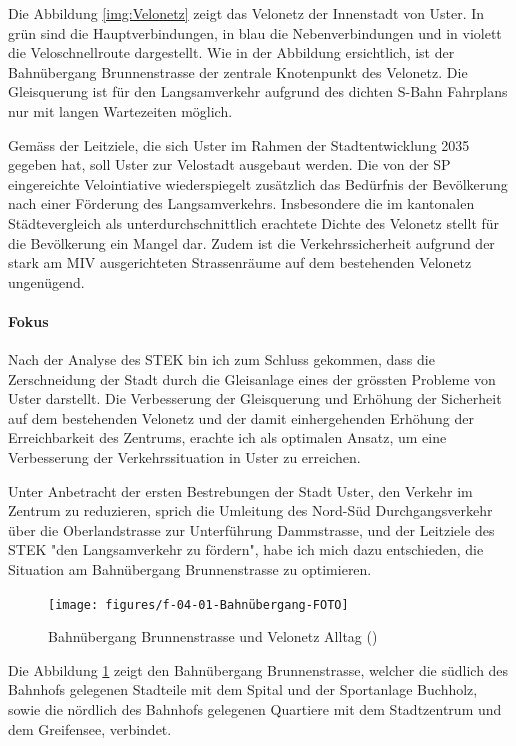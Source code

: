 Die Abbildung \ref{img:Velonetz} zeigt das Velonetz der Innenstadt von Uster. In grün sind die Hauptverbindungen, in blau die Nebenverbindungen und in violett die Veloschnellroute dargestellt. Wie in der Abbildung ersichtlich, ist der Bahnübergang Brunnenstrasse der zentrale Knotenpunkt des Velonetz. Die Gleisquerung ist für den Langsamverkehr aufgrund des dichten S-Bahn Fahrplans nur mit langen Wartezeiten möglich. 

Gemäss der Leitziele, die sich Uster im Rahmen der Stadtentwicklung 2035 gegeben hat, soll Uster zur Velostadt ausgebaut werden. Die von der SP eingereichte Velointiative wiederspiegelt zusätzlich das Bedürfnis der Bevölkerung nach einer Förderung des Langsamverkehrs. Insbesondere die im kantonalen Städtevergleich als unterdurchschnittlich erachtete Dichte des Velonetz stellt für die Bevölkerung ein Mangel dar. Zudem ist die Verkehrssicherheit aufgrund der stark am MIV ausgerichteten Strassenräume auf dem bestehenden Velonetz ungenügend. \\

\paragraph{Fokus} 

Nach der Analyse des STEK bin ich zum Schluss gekommen, dass die Zerschneidung der Stadt durch die Gleisanlage eines der grössten Probleme von Uster darstellt. Die Verbesserung der Gleisquerung und Erhöhung der Sicherheit auf dem bestehenden Velonetz und der damit einhergehenden Erhöhung der Erreichbarkeit des Zentrums, erachte ich als optimalen Ansatz, um eine Verbesserung der Verkehrssituation in Uster zu erreichen. 

Unter Anbetracht der ersten Bestrebungen der Stadt Uster, den Verkehr im Zentrum zu reduzieren, sprich die Umleitung des Nord-Süd Durchgangsverkehr über die Oberlandstrasse zur Unterführung Dammstrasse, und der Leitziele des STEK "den Langsamverkehr zu fördern", habe ich mich dazu entschieden, die Situation am Bahnübergang Brunnenstrasse zu optimieren.


\begin{figure}[h!]
	\centering
	\texttt{[image: figures/f-04-01-Bahnübergang-FOTO]}
	\caption[Bahnübergang Brunnenstrasse]{Bahnübergang Brunnenstrasse und Velonetz Alltag (\cite{GIS})}
	\label{img:Brunnenstrasse}
\end{figure}

Die Abbildung \ref{img:Brunnenstrasse} zeigt den Bahnübergang Brunnenstrasse, welcher die südlich des Bahnhofs gelegenen Stadteile mit dem Spital und der Sportanlage Buchholz, sowie die nördlich des Bahnhofs gelegenen Quartiere mit dem Stadtzentrum und dem Greifensee, verbindet. 

